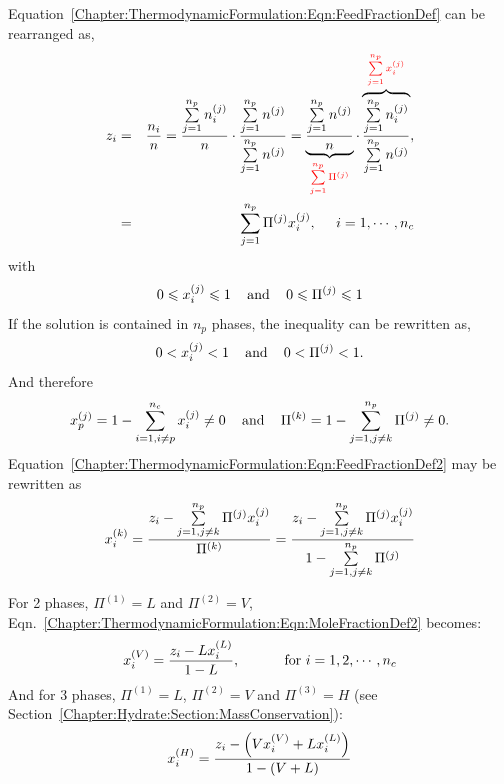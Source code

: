 Equation~\ref{Chapter:ThermodynamicFormulation:Eqn:FeedFractionDef} can be rearranged as,
\begin{eqnarray}
  z_{i} &=& \frc{n_{i}}{n} = \frc{\summation_{j=1}^{n_{p}}\mfr[n]{i}{j}}{n} \cdot \frc{\summation_{j=1}^{n_{p}}\mfr[n]{}{j}}{\summation_{j=1}^{n_{p}}\mfr[n]{}{j}} = \underbrace{\frc{ \summation_{j=1}^{n_{p}}\mfr[n]{}{j}}{n}}_{\red{\summation_{j=1}^{n_{p}}\mfr[\Pi]{}{j}}} \cdot \overbrace{ \frc{\summation_{j=1}^{n_{p}}\mfr[n]{i}{j}}{\summation_{j=1}^{n_{p}}\mfr[n]{}{j}}}^{\red{\summation_{j=1}^{n_{p}}\mfr[x]{i}{j}}}, \nonumber \\
       &=& \summation_{j=1}^{n_{p}} \mfr[\Pi]{}{j}\mfr[x]{i}{j},\;\;\;\;\;i=1, \cdots, n_{c}\hfill\label{Chapter:ThermodynamicFormulation:Eqn:FeedFractionDef2} 
\end{eqnarray}
with 
\begin{equation}
      0\leq \mfr[x]{i}{j} \leq 1 \;\;\;\text{ and }\;\;\; 0\leq\mfr[\Pi]{}{j}\leq 1 \hfill
\end{equation}
If the solution is contained in $n_{p}$ phases, the inequality can be rewritten as, 
\begin{equation}
    0 < \mfr[x]{i}{j} < 1 \;\;\;\text{ and }\;\;\;  0 < \mfr[\Pi]{}{j} < 1.
\end{equation}
And therefore
\begin{displaymath}
   \mfr[x]{p}{j} = 1 - \summation_{i=1,i\ne p}^{n_{c}}\mfr[x]{i}{j} \ne 0 \;\;\;\text{ and }\;\;\; \mfr[\Pi]{}{k} = 1 - \summation_{j=1,j\ne k}^{n_{p}}\mfr[\Pi]{}{j} \ne 0.
\end{displaymath}
Equation~\ref{Chapter:ThermodynamicFormulation:Eqn:FeedFractionDef2} may be rewritten as
\begin{equation}
   \mfr[x]{i}{k} = \frc{ z_{i} - \summation_{j=1,j\ne k}^{n_{p}} \mfr[\Pi]{}{j}\mfr[x]{i}{j}}{\mfr[\Pi]{}{k}} = \frc{ z_{i} - \summation_{j=1,j\ne k}^{n_{p}} \mfr[\Pi]{}{j}\mfr[x]{i}{j}}{ 1 - \summation_{j=1,j\ne k}^{n_{p}} \mfr[\Pi]{}{j}}\label{Chapter:ThermodynamicFormulation:Eqn:MoleFractionDef2}
\end{equation}

\begin{shaded}\noindent
   For 2 phases, $\Pi^{(1)}=L$ and $\Pi^{(2)}=V$, Eqn.~\ref{Chapter:ThermodynamicFormulation:Eqn:MoleFractionDef2} becomes:
     \begin{displaymath}
      \mfr[x]{i}{V} = \frc{z_{i}-L\mfr[x]{i}{L}}{1-L}, \hspace{1cm}\text{ for } i=1,2,\cdots,n_{c}
     \end{displaymath}
     And for 3 phases, $\Pi^{(1)}=L$, $\Pi^{(2)}=V$ and $\Pi^{(3)}=H$ (see Section~\ref{Chapter:Hydrate:Section:MassConservation}):
        \begin{displaymath}
           \mfr[x]{i}{H} = \frc{z_{i}-\left(V \mfr[x]{i}{V} + L \mfr[x]{i}{L}\right)}{1 - \left(V + L \right)}
        \end{displaymath}
\end{shaded}


